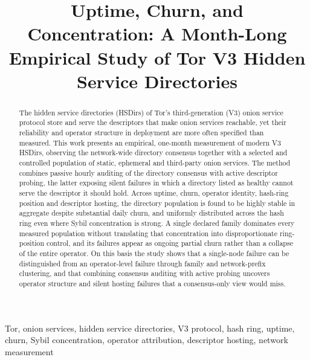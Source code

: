 \documentclass[conference]{IEEEtran}
\begin{document}
\title{Uptime, Churn, and Concentration: A Month-Long Empirical Study of Tor V3 Hidden Service Directories}

\author{
}

\maketitle

\begin{abstract}
The hidden service directories (HSDirs) of Tor's third-generation (V3) onion service protocol store and serve the descriptors that make onion 
services reachable, yet their reliability and operator structure in deployment are more often specified than measured. This work presents an empirical, 
one-month measurement of modern V3 HSDirs, observing the network-wide directory consensus together with a selected and controlled population of static, ephemeral and 
third-party onion services. The method combines passive hourly auditing of the directory consensus with active descriptor probing, the latter exposing silent 
failures in which a directory listed as healthy cannot serve the descriptor it should hold. Across uptime, churn, operator identity, hash-ring position and 
descriptor hosting, the directory population is found to be highly stable in aggregate despite substantial daily churn, and uniformly distributed across 
the hash ring even where Sybil concentration is strong. A single declared family dominates every measured population without translating that concentration 
into disproportionate ring-position control, and its failures appear as ongoing partial churn rather than a collapse of the entire operator. On this basis the study 
shows that a single-node failure can be distinguished from an operator-level failure through family and network-prefix clustering, and that combining 
consensus auditing with active probing uncovers operator structure and silent hosting failures that a consensus-only view would miss.
\end{abstract}

\begin{IEEEkeywords}
Tor, onion services, hidden service directories, V3 protocol, hash ring, uptime, churn, Sybil concentration, operator attribution, descriptor hosting, network measurement
\end{IEEEkeywords}
\end{document}
